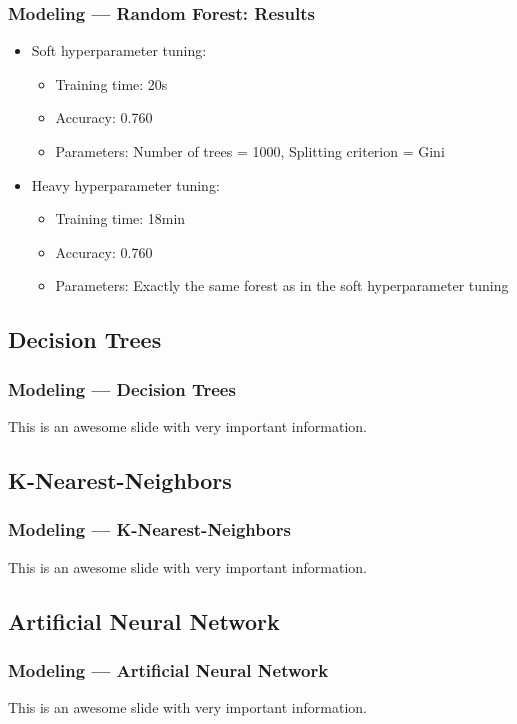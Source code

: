 \documentclass[10pt, aspectratio=169]{beamer}
\begin{document}
\begin{frame}
    \frametitle{Modeling --- Random Forest: Results}
    \begin{itemize}
        \item Soft hyperparameter tuning:
        \begin{itemize}
            \item Training time: 20s
            \item Accuracy: 0.760
            \item Parameters: Number of trees = 1000, Splitting criterion = Gini
        \end{itemize}
        \item Heavy hyperparameter tuning:
        \begin{itemize}
            \item Training time: 18min
            \item Accuracy: 0.760
            \item Parameters: Exactly the same forest as in the soft hyperparameter tuning
        \end{itemize}
    \end{itemize}
\end{frame}

\subsection{Decision Trees}
\begin{frame}
    \frametitle{Modeling --- Decision Trees}
    \begin{outline}
        \1 This is an awesome slide with very important information. 
    \end{outline}
\end{frame}
\subsection{K-Nearest-Neighbors}
\begin{frame}
    \frametitle{Modeling --- K-Nearest-Neighbors}
    \begin{outline}
        \1 This is an awesome slide with very important information. 
    \end{outline}
\end{frame}
\subsection{Artificial Neural Network}
\begin{frame}
    \frametitle{Modeling --- Artificial Neural Network}
    \begin{outline}
        \1 This is an awesome slide with very important information. 
    \end{outline}   
\end{frame}
\end{document}
